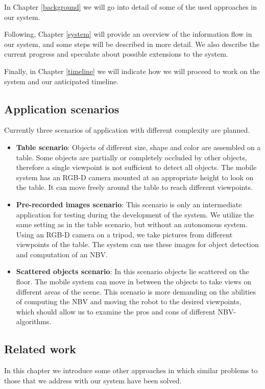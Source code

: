 \documentclass[a4paper,11pt,english]{article}
\begin{document}
In Chapter \ref{background} we will go into detail of some of the used approaches in our system.

Following, Chapter \ref{system} will provide an overview of the information flow in our system, and some steps will be described in more detail.
We also describe the current progress and speculate about possible extensions to the system.

Finally, in Chapter \ref{timeline} we will indicate how we will proceed to work on the system and our anticipated timeline. 
 
\subsection{Application scenarios}
Currently three scenarios of application with different complexity are planned.
\begin{itemize}	
	\item \textbf{Table scenario}: Objects of different size, shape and color are assembled on a table.
	Some objects are partially or completely occluded by other objects, therefore a single viewpoint is not sufficient to detect all objects.
	The mobile system has an RGB-D camera mounted at an appropriate height to look on the table.
	It can move freely around the table to reach different viewpoints.
	\item \textbf{Pre-recorded images scenario}: This scenario is only an intermediate application for testing during the development of the system.
	We utilize the same setting as in the table scenario, but without an autonomous system.
	Using an RGB-D camera on a tripod, we take pictures from different viewpoints of the table.
	The system can use these images for object detection and computation of an NBV.
	\item \textbf{Scattered objects scenario}: In this scenario objects lie scattered on the floor.
	The mobile system can move in between the objects to take views on different areas of the scene.
	This scenario is more demanding on the abilities of computing the NBV and moving the robot to the desired viewpoints, which should allow us to examine the pros and cons of different NBV-algorithms.
\end{itemize} 

\subsection{Related work}
In this chapter we introduce some other approaches in which similar problems to those that we address with our system have been solved.\medskip
\end{document}
